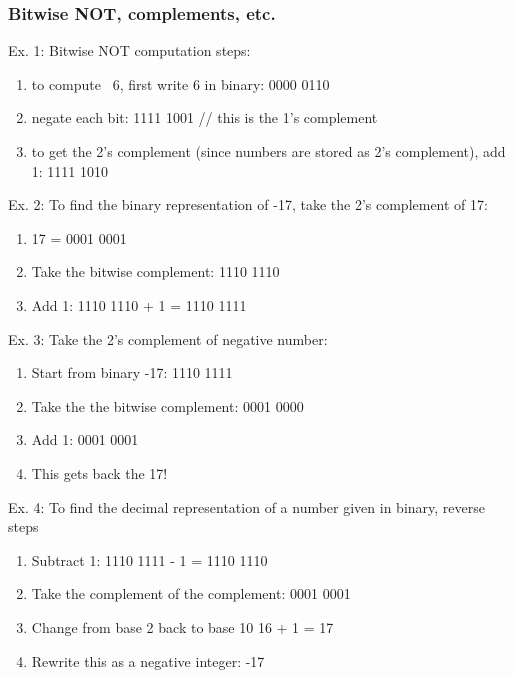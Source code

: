 \documentclass{scrartcl}
\begin{document}
    \subsubsection{Bitwise NOT, complements, etc.}

    Ex. 1: Bitwise NOT computation steps:

    \begin{enumerate}
        \item to compute ~6, first write 6 in binary: 0000 0110
        \item negate each bit: 1111 1001 // this is the 1's complement
        \item to get the 2's complement (since numbers are stored as 2’s complement), add 1: 1111 1010
    \end{enumerate}

    Ex. 2: To find the binary representation of -17, take the 2's complement of 17:

    \begin{enumerate}
        \item 17 = 0001 0001
        \item Take the bitwise complement: 1110 1110
        \item Add 1: 1110 1110 + 1 = 1110 1111
    \end{enumerate}

    Ex. 3: Take the 2's complement of negative number:
    \begin{enumerate}
        \item Start from binary -17: 1110 1111
        \item     Take the the bitwise complement: 0001 0000
        \item     Add 1: 0001 0001
        \item     This gets back the 17!
    \end{enumerate}

    Ex. 4: To find the decimal representation of a number given in binary, reverse steps
   \begin{enumerate}
       \item  Subtract 1: 1110 1111 - 1 = 1110 1110
       \item     Take the complement of the complement: 0001 0001
       \item     Change from base 2 back to base 10 16 + 1 = 17
       \item     Rewrite this as a negative integer: -17
   \end{enumerate}
\end{document}
